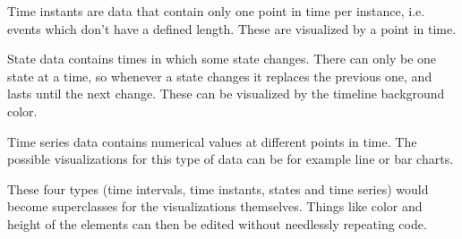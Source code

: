 Time instants are data that contain only one point in time per instance, i.e. events which don't have a defined length. These are visualized by a point in time.

State data contains times in which some state changes. There can only be one state at a time, so whenever a state changes it replaces the previous one, and lasts until the next change. These can be visualized by the timeline background color.

Time series data contains numerical values at different points in time. The possible visualizations for this type of data can be for example line or bar charts.

These four types (time intervals, time instants, states and time series) would become superclasses for the visualizations themselves. Things like color and height of the elements can then be edited without needlessly repeating  code.